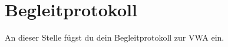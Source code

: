 \chapter{Begleitprotokoll}
\label{cha:begleitprotokoll}

An dieser Stelle fügst du dein Begleitprotokoll zur VWA ein. 